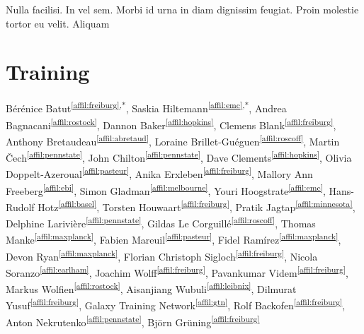 \begin{savequote}[75mm]
Nulla facilisi. In vel sem. Morbi id urna in diam dignissim feugiat. Proin molestie tortor eu velit. Aliquam
\end{savequote}

\chapter{Training}
\label{training}
\setcounter{figure}{-1}
\setcounter{table}{-1}
\setcounter{section}{-1}
\setcounter{NAT@ctr}{-1}

\newpage
{}
Bérénice Batut\textsuperscript{\ref{affil:freiburg},*},
Saskia Hiltemann\textsuperscript{\ref{affil:emc},*},
Andrea Bagnacani\textsuperscript{\ref{affil:rostock}},
Dannon Baker\textsuperscript{\ref{affil:hopkins}},
Clemens Blank\textsuperscript{\ref{affil:freiburg}},
Anthony Bretaudeau\textsuperscript{\ref{affil:abretaud}},
Loraine Brillet-Guéguen\textsuperscript{\ref{affil:roscoff}},
Martin Čech\textsuperscript{\ref{affil:pennstate}},
John Chilton\textsuperscript{\ref{affil:pennstate}},
Dave Clements\textsuperscript{\ref{affil:hopkins}},
Olivia Doppelt-Azeroual\textsuperscript{\ref{affil:pasteur}},
Anika Erxleben\textsuperscript{\ref{affil:freiburg}},
Mallory Ann Freeberg\textsuperscript{\ref{affil:ebi}},
Simon Gladman\textsuperscript{\ref{affil:melbourne}},
Youri Hoogstrate\textsuperscript{\ref{affil:emc}},
Hans-Rudolf Hotz\textsuperscript{\ref{affil:basel}},
Torsten Houwaart\textsuperscript{\ref{affil:freiburg}},
Pratik Jagtap\textsuperscript{\ref{affil:minnesota}},
Delphine Larivière\textsuperscript{\ref{affil:pennstate}},
Gildas Le Corguillé\textsuperscript{\ref{affil:roscoff}},
Thomas Manke\textsuperscript{\ref{affil:maxplanck}},
Fabien Mareuil\textsuperscript{\ref{affil:pasteur}},
Fidel Ramírez\textsuperscript{\ref{affil:maxplanck}},
Devon Ryan\textsuperscript{\ref{affil:maxplanck}},
Florian Christoph Sigloch\textsuperscript{\ref{affil:freiburg}},
Nicola Soranzo\textsuperscript{\ref{affil:earlham}},
Joachim Wolff\textsuperscript{\ref{affil:freiburg}},
Pavankumar Videm\textsuperscript{\ref{affil:freiburg}},
Markus Wolfien\textsuperscript{\ref{affil:rostock}},
Aisanjiang Wubuli\textsuperscript{\ref{affil:leibnix}},
Dilmurat Yusuf\textsuperscript{\ref{affil:freiburg}},
Galaxy Training Network\textsuperscript{\ref{affil:gtn}},
Rolf Backofen\textsuperscript{\ref{affil:freiburg}},
Anton Nekrutenko\textsuperscript{\ref{affil:pennstate}},
Björn Grüning\textsuperscript{\ref{affil:freiburg}}

